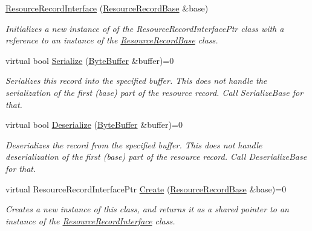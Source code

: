 \begin{DoxyCompactItemize}
\item 
\hyperlink{class_senergy_1_1_dns_1_1_resource_record_interface_a512292e35ab101cc53bafe4c21edac4c}{Resource\-Record\-Interface} (\hyperlink{class_senergy_1_1_dns_1_1_resource_record_base}{Resource\-Record\-Base} \&base)
\begin{DoxyCompactList}\small\item\em Initializes a new instance of of the Resource\-Record\-Interface\-Ptr class with a reference to an instance of the \hyperlink{class_senergy_1_1_dns_1_1_resource_record_base}{Resource\-Record\-Base} class. \end{DoxyCompactList}\item 
virtual bool \hyperlink{class_senergy_1_1_dns_1_1_resource_record_interface_ab81e0a7ea292513c5c34a3be0c7a6dca}{Serialize} (\hyperlink{class_senergy_1_1_byte_buffer}{Byte\-Buffer} \&buffer)=0
\begin{DoxyCompactList}\small\item\em Serializes this record into the specified buffer. This does not handle the serialization of the first (base) part of the resource record. Call Serialize\-Base for that. \end{DoxyCompactList}\item 
virtual bool \hyperlink{class_senergy_1_1_dns_1_1_resource_record_interface_ade2e0b9817476ea2161b694efd3e02db}{Deserialize} (\hyperlink{class_senergy_1_1_byte_buffer}{Byte\-Buffer} \&buffer)=0
\begin{DoxyCompactList}\small\item\em Deserializes the record from the specified buffer. This does not handle deserialization of the first (base) part of the resource record. Call Deserialize\-Base for that. \end{DoxyCompactList}\item 
virtual Resource\-Record\-Interface\-Ptr \hyperlink{class_senergy_1_1_dns_1_1_resource_record_interface_acac5440b40f3904f889f1ee59a3b9786}{Create} (\hyperlink{class_senergy_1_1_dns_1_1_resource_record_base}{Resource\-Record\-Base} \&base)=0
\begin{DoxyCompactList}\small\item\em Creates a new instance of this class, and returns it as a shared pointer to an instance of the \hyperlink{class_senergy_1_1_dns_1_1_resource_record_interface}{Resource\-Record\-Interface} class. \end{DoxyCompactList}\item 

\end{DoxyCompactItemize}
